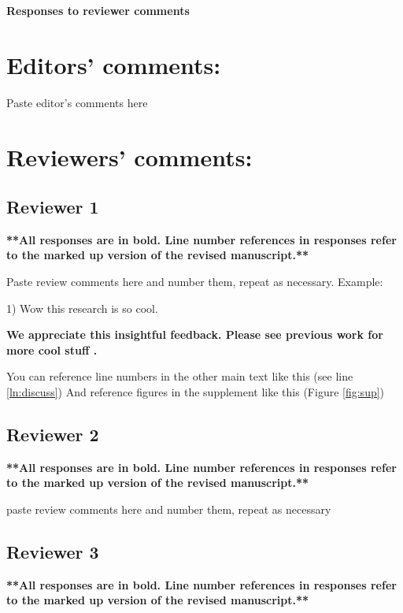 \documentclass[12pt, letterpaper]{article}
\newenvironment{response}{\bfseries}{}
\begin{document}
\begin{center}
    \textbf{\Large{Responses to reviewer comments}}
\end{center}

\section*{Editors’ comments:}

Paste editor's comments here

\section*{Reviewers' comments:}

\subsection*{Reviewer 1}

\begin{center}
    \textbf{**All responses are in bold. Line number references in responses refer to the marked up version of the revised manuscript.**}
\end{center}

Paste review comments here and number them, repeat as necessary. Example:

1) Wow this research is so cool. 

\begin{response}
We appreciate this insightful feedback. Please see previous work for more cool stuff \citep{corbett-detig_natural_2015}.

You can reference line numbers in the other main text like this (see line \ref{ln:discuss}) And reference figures in the supplement like this (Figure \ref{fig:sup})

\end{response}

\subsection*{Reviewer 2}

\begin{center}
    \textbf{**All responses are in bold. Line number references in responses refer to the marked up version of the revised manuscript.**}
\end{center}

paste review comments here and number them, repeat as necessary

\subsection*{Reviewer 3}

\begin{center}
    \textbf{**All responses are in bold. Line number references in responses refer to the marked up version of the revised manuscript.**}
\end{center}




\end{document}
